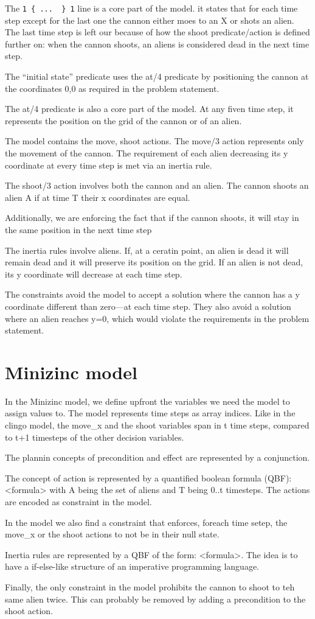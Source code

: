\documentclass[11pt]{article}
\begin{document}
The \verb|1 { ...  } 1| line is a core part of the model.
it states that for each time step except for the last one the cannon either moes to an X or shots an alien.
The last time step is left our because of how the shoot predicate/action is defined further on: when the cannon shoots, an aliens is considered dead in the next time step.

The ``initial state'' predicate uses the at/4 predicate by positioning the cannon at the coordinates 0,0 as required in the problem statement.

The at/4 predicate is also a core part of the model. At any fiven time step, it represents the position on the grid of the cannon or of an alien.

The model contains the move, shoot actions. The move/3 action represents only the movement of the cannon. The requirement of each alien decreasing its y coordinate at every time step is met via an inertia rule.

The shoot/3 action involves both the cannon and an alien. The cannon shoots an alien A if at time T their x coordinates are equal.

Additionally, we are enforcing the fact that if the cannon shoots, it will stay in the same position in the next time step

The inertia rules involve aliens. If, at a ceratin point, an alien is dead it will remain dead and it will preserve its position on the grid. If an alien is not dead, its y coordinate will decrease at each time step.

The constraints avoid the model to accept a solution where the cannon has a y coordinate different than zero---at each time step. They also avoid a solution where an alien reaches y=0, which would violate the requirements in the problem statement.



\section{Minizinc model}

In the Minizinc model, we define upfront the variables we need the model to assign values to. The model represents time steps as array indices. Like in the clingo model, the move\_x and the shoot variables span in t time steps, compared to t+1 timesteps of the other decision variables.

The plannin concepts of precondition and effect are represented by a conjunction.

The concept of action is represented by a quantified boolean formula (QBF): <formula> with A being the set of aliens and T being 0..t timesteps. The actions are encoded as constraint in the model.

In the model we also find a constraint that enforces, foreach time setep, the move\_x or the shoot actions to not be in their null state.

Inertia rules are represented by a QBF of the form: <formula>. The idea is to have a if-else-like structure of an imperative programming language.

Finally, the only constraint in the model prohibits the cannon to shoot to teh same alien twice. This can probably be removed by adding a precondition to the shoot action.
\end{document}
